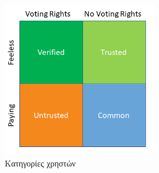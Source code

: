 \begin{figure}[H]
    \centering
    \includegraphics[width=0.6\textwidth]{assets/figures/chapter-3/user_categories}
    \caption{Κατηγορίες χρηστών}
    \label{figure:3-2-use-categories-diagram}
\end{figure}
